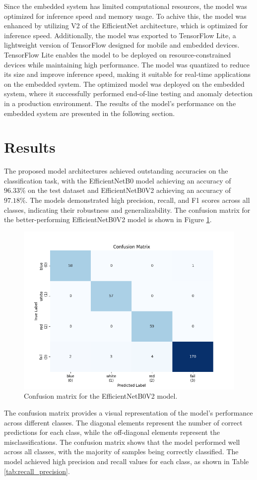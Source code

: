 \documentclass[lettersize,journal]{IEEEtran}
\begin{document}
Since the embedded system has limited computational resources, the model was optimized for inference speed and memory usage. To achive this, the model was enhanced by utilizing V2 of the EfficientNet architecture, which is optimized for inference speed. Additionally, the model was exported to TensorFlow Lite, a lightweight version of TensorFlow designed for mobile and embedded devices. TensorFlow Lite enables the model to be deployed on resource-constrained devices while maintaining high performance. The model was quantized to reduce its size and improve inference speed, making it suitable for real-time applications on the embedded system. The optimized model was deployed on the embedded system, where it successfully performed end-of-line testing and anomaly detection in a production environment. The results of the model's performance on the embedded system are presented in the following section.


\section{Results}

The proposed model architectures achieved outstanding accuracies on the classification task, with the EfficientNetB0 model achieving an accuracy of $96.33\%$ on the test dataset and EfficientNetB0V2 achieving an accuracy of $97.18\%$. The models demonstrated high precision, recall, and F1 scores across all classes, indicating their robustness and generalizability. The confusion matrix for the better-performing EfficientNetB0V2 model is shown in Figure \ref{fig:confusion_matrix}.

\begin{figure}[!h]
  \centering
  \includegraphics[width=.5\textwidth]{../plots/confusion_matrix.png}
  \caption{Confusion matrix for the EfficientNetB0V2 model.}
  \label{fig:confusion_matrix}
\end{figure}

The confusion matrix provides a visual representation of the model's performance across different classes. The diagonal elements represent the number of correct predictions for each class, while the off-diagonal elements represent the misclassifications. The confusion matrix shows that the model performed well across all classes, with the majority of samples being correctly classified. The model achieved high precision and recall values for each class, as shown in Table \ref{tab:recall_precision}.
\end{document}
